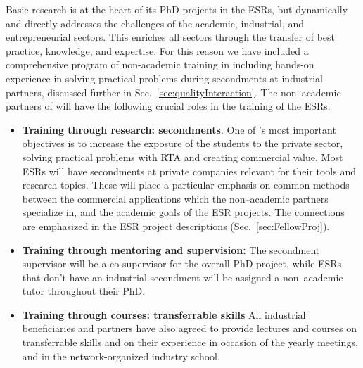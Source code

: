 Basic research is at the heart of its PhD projects in the ESRs, but \acronym dynamically and directly addresses the challenges of the academic, industrial,
and entrepreneurial sectors. 
This enriches all sectors through the transfer of best practice, knowledge, and expertise.
For this reason we have included a comprehensive program of non-academic training in \acronym  including hands-on experience in solving practical problems during secondments
at industrial partners, discussed further in Sec.~\ref{sec:qualityInteraction}.
The non--academic partners of \acronym will have the following crucial roles in the training of the ESRs:
\begin{itemize}
\item \textbf{Training through research: secondments}. One of \acronym's most important objectives is to increase the exposure of the students to the private sector, solving practical problems with RTA and creating commercial value. 
Most ESRs will have secondments at private companies relevant for their tools and research topics.
These will place a particular emphasis on common methods between the commercial applications which the non--academic partners specialize in, and the academic goals of the ESR projects. 
The connections are emphasized in the ESR project descriptions (Sec.~\ref{sec:FellowProj}). 
\item \textbf{Training through mentoring and supervision:} The secondment supervisor will be a co-supervisor for the overall PhD project, while ESRs that don't have an industrial secondment will be assigned a non--academic tutor throughout their PhD.
\item \textbf{Training through courses: transferrable skills} All industrial beneficiaries and partners have also agreed to provide lectures and courses on transferrable skills and on their experience in occasion of the yearly meetings, and in the network-organized industry school. 
\end{itemize}

